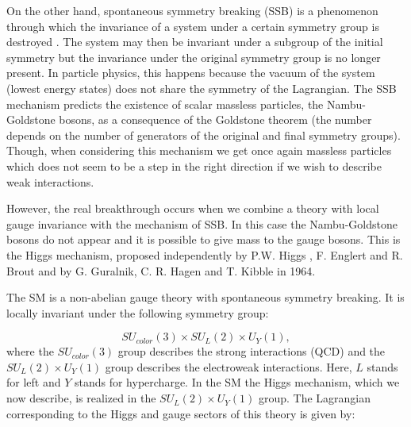 On the other hand, spontaneous symmetry breaking (SSB) is a phenomenon through which the invariance of a system under a certain symmetry group is destroyed \cite{SSB}. The system may then be invariant under a subgroup of the initial symmetry but the invariance under the original symmetry group is no longer present. In particle physics, this happens because the vacuum of the system (lowest energy states) does not share the symmetry of the Lagrangian. The SSB mechanism predicts the existence of scalar massless particles, the Nambu-Goldstone bosons, as a consequence of the Goldstone theorem \cite{Goldstone} (the number depends on the number of generators of the original and final symmetry groups). Though, when considering this mechanism we get once again massless particles which does not seem to be a step in the right direction if we wish to describe weak interactions. 

However, the real breakthrough occurs when we combine a theory with local gauge invariance with the mechanism of SSB. In this case the Nambu-Goldstone bosons do not appear and it is possible to give mass to the gauge bosons. This is the Higgs mechanism, proposed independently by P.W. Higgs \cite{Higgs}, F. Englert and R. Brout \cite{EnglertBrout} and by G. Guralnik, C. R. Hagen and T. Kibble \cite{Guralnik} in 1964. 

The SM is a non-abelian gauge theory with spontaneous symmetry breaking. It is locally invariant under the following symmetry group:

\begin{equation}
SU_{color}(3)\times SU_L(2)\times U_Y(1), 
\end{equation} 
where the $SU_{color}(3)$ group describes the strong interactions (QCD) and the $SU_L(2)\times U_Y(1)$ group describes the electroweak interactions. Here, $L$ stands for left and $Y$ stands for hypercharge. In the SM the Higgs mechanism, which we now describe, is realized in the $SU_L(2)\times U_Y(1)$ group. The Lagrangian corresponding to the Higgs and gauge sectors of this theory is given by:

